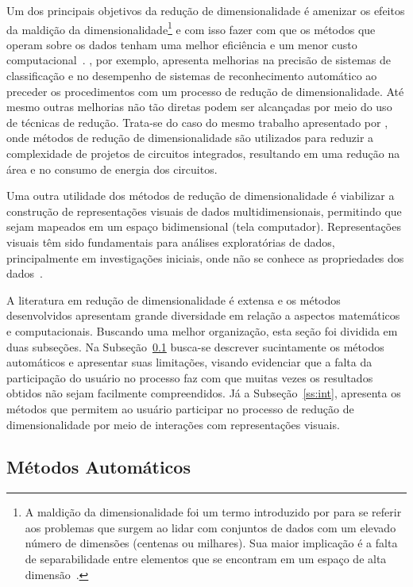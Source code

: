 Um dos principais objetivos da redução de dimensionalidade é
amenizar os efeitos da maldição da
dimensionalidade\footnote{A maldição da dimensionalidade foi
    um termo introduzido por \citet{Bellman1961} para se
    referir aos problemas que surgem ao lidar com conjuntos
    de dados com um elevado número de dimensões (centenas ou
    milhares). Sua maior implicação é a falta de
separabilidade entre elementos que se encontram em um espaço
de alta dimensão~\cite{Kouiroukidis2011}.} e com isso fazer
com que os métodos que operam sobre os dados tenham uma
melhor eficiência e um menor custo
computacional~\cite{Maaten2009}.  \citet{Konig2000}, por
exemplo, apresenta melhorias na precisão de sistemas de
classificação e no desempenho de sistemas de reconhecimento
automático ao preceder os procedimentos com um processo de
redução de dimensionalidade. Até mesmo outras melhorias não
tão diretas podem ser alcançadas por meio do uso de técnicas
de redução.  Trata-se do caso do mesmo trabalho apresentado
por \citet{Konig2000}, onde métodos de redução de
dimensionalidade são utilizados para reduzir a complexidade
de projetos de circuitos integrados, resultando em uma
redução na área e no consumo de energia dos circuitos. 

Uma outra utilidade dos métodos de redução de
dimensionalidade é viabilizar a construção de representações
visuais de dados multidimensionais, permitindo que sejam
mapeados em um espaço bidimensional (tela computador).
Representações visuais têm sido fundamentais para análises
exploratórias de dados, principalmente em investigações
iniciais, onde não
se conhece as propriedades dos dados~\cite{Kaski2011}. 

A literatura em redução de dimensionalidade é extensa e os
métodos desenvolvidos apresentam grande diversidade em
relação a aspectos matemáticos e computacionais. Buscando
uma melhor organização, esta seção foi dividida em duas
subseções. Na Subseção~\ref{ss:auto} busca-se descrever
sucintamente os métodos automáticos e apresentar suas
limitações, visando evidenciar que a falta da participação
do usuário no processo faz com que muitas vezes os
resultados obtidos não sejam facilmente compreendidos. Já a
Subseção~\ref{ss:int}, apresenta os métodos que permitem ao
usuário participar no processo de redução de
dimensionalidade por meio de interações com representações
visuais. 

\subsection{Métodos Automáticos}\label{ss:auto}

